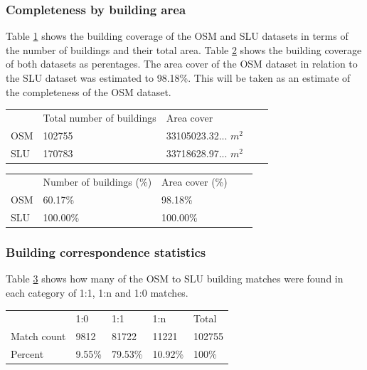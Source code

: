 \documentclass{kththesis}
\begin{document}
\subsubsection{Completeness by building area}

Table \ref{table:num-of-buildings} shows the building coverage of the OSM and SLU datasets in terms of the number of buildings and their total area.
Table \ref{table:num-of-buildings-percent} shows the building coverage of both datasets as perentages.
The area cover of the OSM dataset in relation to the SLU dataset was estimated to 98.18\%. This will be taken as an estimate of the completeness of the OSM dataset.

\begin{table}[H]
    \begin{tabular}{lllll}
        & Total number of buildings & Area cover \\
        OSM & 102755 & 33105023.32... $m^2$ \\
        SLU & 170783 & 33718628.97... $m^2$
    \end{tabular}
    \label{table:num-of-buildings}
\end{table}

\begin{table}[H]
    \begin{tabular}{lllll}
        & Number of buildings (\%) & Area cover (\%) \\
        OSM & 60.17\% & 98.18\% \\
        SLU & 100.00\% & 100.00\%
    \end{tabular}
    \label{table:num-of-buildings-percent}
\end{table}

\subsubsection{Building correspondence statistics}

Table \ref{table:building-matching} shows how many of the OSM to SLU building matches were found in each category of 1:1, 1:n and 1:0 matches.

\begin{table}[H]
    \begin{tabular}{lllll}
        & 1:0 & 1:1 & 1:n & Total \\
        Match count & 9812   & 81722   & 11221   & 102755 \\
        Percent     & 9.55\% & 79.53\% & 10.92\% & 100\%
    \end{tabular}
    \label{table:building-matching}
\end{table}
\end{document}
